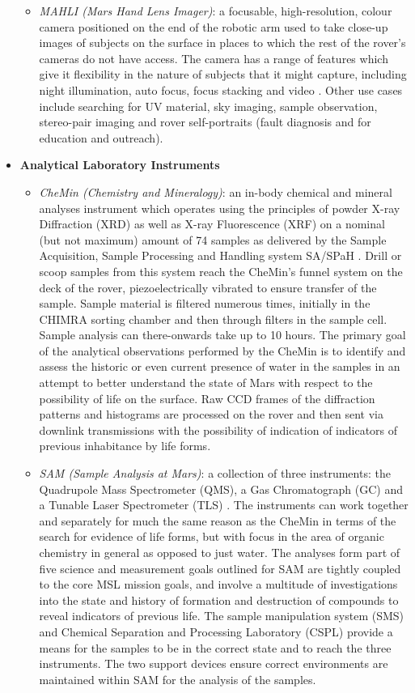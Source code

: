 \begin{itemize}
\begin{itemize}
            \item \textit{MAHLI (Mars Hand Lens Imager)}: a focusable, high-resolution, colour camera positioned on the end of the robotic arm used to take close-up images of subjects on the surface in places to which the rest of the rover's cameras do not have access. The camera has a range of features which give it flexibility in the nature of subjects that it might capture, including night illumination, auto focus, focus stacking and video \cite{mslsciencecornermahli}. Other use cases include searching for UV material, sky imaging, sample observation, stereo-pair imaging and rover self-portraits (fault diagnosis and for education and outreach).
          \end{itemize}
          \item \textbf{Analytical Laboratory Instruments}
          \begin{itemize}
            \item \textit{CheMin (Chemistry and Mineralogy)}: an in-body chemical and mineral analyses instrument which operates using the principles of powder X-ray Diffraction (XRD) as well as X-ray Fluorescence (XRF) on a nominal (but not maximum) amount of 74 samples as delivered by the Sample Acquisition, Sample Processing and Handling system SA/SPaH \cite{mslsciencecornerchemin}. Drill or scoop samples from this system reach the CheMin's funnel system on the deck of the rover, piezoelectrically vibrated to ensure transfer of the sample. Sample material is filtered numerous times, initially in the CHIMRA sorting chamber and then through filters in the sample cell. Sample analysis can there-onwards take up to 10 hours. The primary goal of the analytical observations performed by the CheMin is to identify and assess the historic or even current presence of water in the samples in an attempt to better understand the state of Mars with respect to the possibility of life on the surface. Raw CCD frames of the diffraction patterns and histograms are processed on the rover and then sent via downlink transmissions with the possibility of indication of indicators of previous inhabitance by life forms.
            \item \textit{SAM (Sample Analysis at Mars)}: a collection of three instruments: the Quadrupole Mass Spectrometer (QMS), a Gas Chromatograph (GC) and a Tunable Laser Spectrometer (TLS) \cite{mslsciencecornersam}. The instruments can work together and separately for much the same reason as the CheMin in terms of the search for evidence of life forms, but with focus in the area of organic chemistry in general as opposed to just water. The analyses form part of five science and measurement goals outlined for SAM are tightly coupled to the core MSL mission goals, and involve a multitude of investigations into the state and history of formation and destruction of compounds to reveal indicators of previous life. The sample manipulation system (SMS) and Chemical Separation and Processing Laboratory (CSPL) provide a means for the samples to be in the correct state and to reach the three instruments. The two support devices ensure correct environments are maintained within SAM for the analysis of the samples.

\end{itemize}
\end{itemize}
